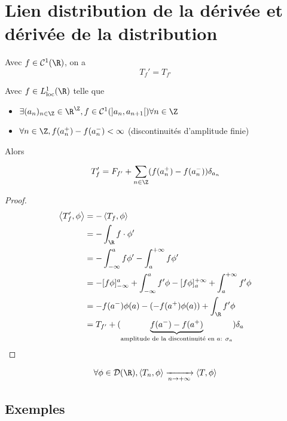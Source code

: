 	\section{Lien distribution de la dérivée et dérivée de la distribution}
	
	\begin{theorem}
		Avec $f\in \mathcal{C}^1(\R)$, on a 
		\[
			T_f' = T_{f'}
		\] 
		
		Avec $f\in L_{\text{loc}}^1(\R)$ telle que 
		\begin{itemize}
			\item $\exists (a_n)_{n\in \Z} \in \R^\Z, f \in \mathcal{C}^1(]a_n, a_{n+1}[) \forall n\in \Z$
			\item $\forall n \in \Z, f(a_n^+) - f(a_n^-) < \infty$ (discontinuités d'amplitude finie)
		\end{itemize}

		Alors

		\[
			T_f' = F_{f'} + \sum_{n\in \Z} (f(a_n^+) - f(a_n^-)) \delta_{a_n}
		\] 
	\end{theorem}

	\begin{proof}
		\begin{align*}
		\left<T_f', \phi \right> &= -\left<T_f, \phi \right> \\
		&= - \int_{\R} f \cdot \phi'\\
		&= -\int_{-\infty}^a f\phi' - \int_a^{+\infty} f\phi' \\
		&= -[f\phi]_{-\infty}^a + \int_{-\infty}^a f'\phi - [f\phi]_a^{+\infty} + \int_a^{+\infty} f'\phi \\
		&= -f(a^-) \phi(a) - (-f(a^+) \phi(a)) + \int_\R f' \phi \\
		&= T_{f'} + (\underbrace{f(a^-) - f(a^+)}_{\text{amplitude de la discontinuité en $a$: $\sigma_a$}}) \delta_a \\
		\end{align*}
	\end{proof}

	\begin{definition}
		\begin{align*}
			\forall \phi\in \mathcal{D}(\R), \left<T_n, \phi \right> \xrightarrow[n\to +\infty]{} \left<T, \phi \right>
		\end{align*}
	\end{definition}

	\subsection{Exemples}

